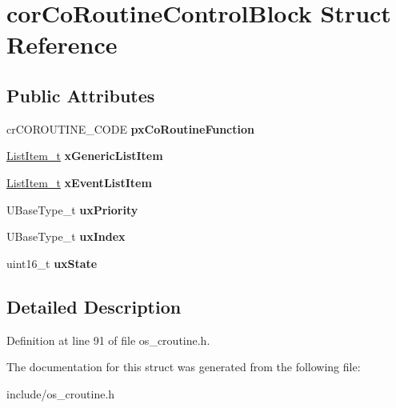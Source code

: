 \hypertarget{structcorCoRoutineControlBlock}{}\section{cor\+Co\+Routine\+Control\+Block Struct Reference}
\label{structcorCoRoutineControlBlock}
\subsection*{Public Attributes}
\begin{DoxyCompactItemize}
\item 
\mbox{\label{structcorCoRoutineControlBlock_acc98c7364cd88e8e034a5f9bba113832}} 
cr\+C\+O\+R\+O\+U\+T\+I\+N\+E\+\_\+\+C\+O\+DE {\bfseries px\+Co\+Routine\+Function}
\item 
\mbox{\label{structcorCoRoutineControlBlock_aa2900494db8782eeb8ef12d482501406}} 
\mbox{\hyperlink{structxLIST__ITEM}{List\+Item\+\_\+t}} {\bfseries x\+Generic\+List\+Item}
\item 
\mbox{\label{structcorCoRoutineControlBlock_a105d316da0069f766acc3b210afed1b9}} 
\mbox{\hyperlink{structxLIST__ITEM}{List\+Item\+\_\+t}} {\bfseries x\+Event\+List\+Item}
\item 
\mbox{\label{structcorCoRoutineControlBlock_a752101a5d41b5caa7fd5149436613c8f}} 
U\+Base\+Type\+\_\+t {\bfseries ux\+Priority}
\item 
\mbox{\label{structcorCoRoutineControlBlock_a6c185cd2145f562fb570bea9b158fc81}} 
U\+Base\+Type\+\_\+t {\bfseries ux\+Index}
\item 
\mbox{\label{structcorCoRoutineControlBlock_aa0d702ff5a23c61598fe13e5a78fb1dc}} 
uint16\+\_\+t {\bfseries ux\+State}
\end{DoxyCompactItemize}


\subsection{Detailed Description}


Definition at line 91 of file os\+\_\+croutine.\+h.



The documentation for this struct was generated from the following file\+:\begin{DoxyCompactItemize}
\item 
include/os\+\_\+croutine.\+h\end{DoxyCompactItemize}
